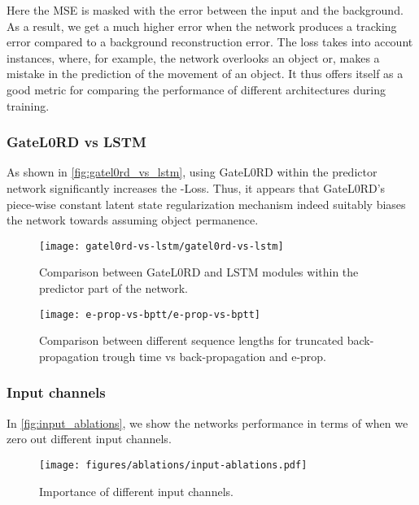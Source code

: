 \documentclass{article} \usepackage{iclr2023_conference_arxiv,times}
\begin{document}
Here the MSE is masked with the error between the input and the background. As a result, we get a much higher error when the network produces a tracking error compared to a background reconstruction error. The  loss takes into account instances, where, for example, the network overlooks an object or, makes a mistake in the prediction of the movement of an object.
It thus offers itself as a good metric for comparing the performance of different architectures during training.


\subsubsection{GateL0RD vs LSTM}

As shown in \autoref{fig:gatel0rd_vs_lstm}, using GateL0RD within the predictor network significantly increases the -Loss. Thus, it appears that GateL0RD's piece-wise constant latent state regularization mechanism indeed suitably biases the network towards assuming object permanence.

\begin{figure}[t]
  \texttt{[image: gatel0rd-vs-lstm/gatel0rd-vs-lstm]}
  \vspace{-.75cm}
  \caption{Comparison between GateL0RD and LSTM modules within the predictor part of the network.}
  \label{fig:gatel0rd_vs_lstm}
\end{figure}

\begin{figure}
  \texttt{[image: e-prop-vs-bptt/e-prop-vs-bptt]}
  \vspace{-.75cm}
  \caption{Comparison between different sequence lengths for truncated back-propagation trough time vs back-propagation and e-prop.}
  \label{fig:eprop_vs_bptt}
\end{figure}

\subsubsection{Input channels}

In \autoref{fig:input_ablations}, we show the networks performance in terms of  when we zero out different input channels.

\begin{figure}
  \texttt{[image: figures/ablations/input-ablations.pdf]}
  \vspace{-.75cm}
  \caption{Importance of different input channels.}
  \label{fig:input_ablations}
\end{figure}
\end{document}
